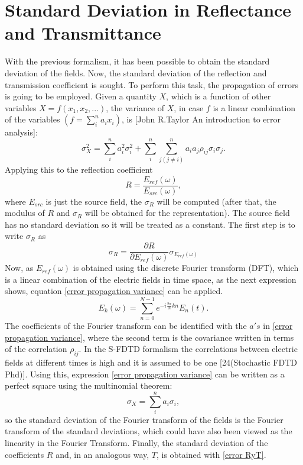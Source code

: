 \documentclass[12pt, oneside]{book}
\begin{document}
\section{Standard Deviation in Reflectance and Transmittance}
With the previous formalism, it has been possible to obtain the standard deviation of the fields. Now, the standard deviation of the reflection and transmission coefficient is sought. To perform this task, the propagation of errors is going to be employed. Given a quantity $X$, which is a function of other variables $X=f(x_1,x_2,...)$, the variance of $X$, in case $f$ is a linear combination of the variables $\left( f= \sum_i^n a_i x_i \right)$, is [John R.Taylor An introduction to error analysis]:
\begin{equation}\label{error propagation variance}
\sigma_X ^2 = \sum_i ^n a_i^2 \sigma_i^2 + \sum_i^n \sum_{j(j\neq i)} ^n a_i a_j \rho_{ij} \sigma_i \sigma_j .
\end{equation}
Applying this to the reflection coefficient 
\begin{equation}
R=\frac{E_{ref}(\omega)}{E_{src}(\omega)} ,
\end{equation}
where $E_{src}$ is just the source field, the $\sigma_R$ will be computed (after that, the modulus of $R$ and $\sigma_R$ will be obtained for the representation). The source field has no standard deviation so it will be treated as a constant. The first step is to write $\sigma_R$ as
\begin{equation} \label{error RyT}
\sigma_R= \frac{\partial R}{\partial E_{ref}(\omega)} \sigma_{E_{ref}(\omega)}
\end{equation} 
Now, as $E_{ref}(\omega)$ is obtained using the discrete Fourier transform (DFT), which is a linear combination of the electric fields in time space, as the next expression shows, equation \ref{error propagation variance} can be applied.
\begin{equation}
E_k(\omega)=\sum_{n=0}^{N-1} e^{-i\frac{2\pi}{N} k n} E_n(t).
\end{equation} 
The coefficients of the Fourier transform can be identified with the $a's$ in \ref{error propagation variance}, where the second term is the covariance written in terms of the correlation $\rho_{ij}$. In the S-FDTD formalism the correlations between electric fields at different times is high and it is assumed to be one [24(Stochastic FDTD Phd)]. Using this, expression \ref{error propagation variance} can be written as a perfect square using the multinomial theorem:
\begin{equation}
\sigma_X=\sum_i ^n a_i \sigma_i,
\end{equation}
so the standard deviation of the Fourier transform of the fields is the Fourier transform of the standard deviations, which could have also been viewed as the linearity in the Fourier Transform.
Finally, the standard deviation of the coefficients $R$ and, in an analogous way, $T$, is obtained with \ref{error RyT}.
\end{document}
